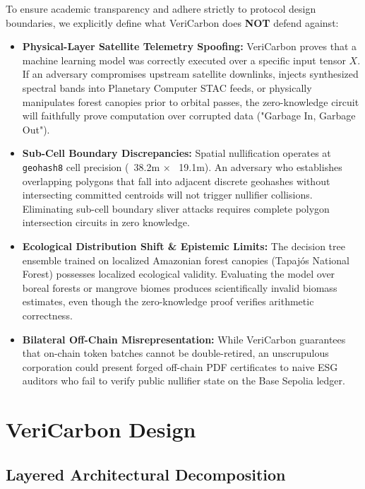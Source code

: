 \documentclass[preprint,12pt]{elsarticle}
\begin{document}
To ensure academic transparency and adhere strictly to protocol design boundaries, we explicitly define what VeriCarbon does \textbf{NOT} defend against:
\begin{itemize}
\item \textbf{Physical-Layer Satellite Telemetry Spoofing:} VeriCarbon proves that a machine learning model was correctly executed over a specific input tensor $X$. If an adversary compromises upstream satellite downlinks, injects synthesized spectral bands into Planetary Computer STAC feeds, or physically manipulates forest canopies prior to orbital passes, the zero-knowledge circuit will faithfully prove computation over corrupted data ("Garbage In, Garbage Out").
\item \textbf{Sub-Cell Boundary Discrepancies:} Spatial nullification operates at \texttt{geohash8} cell precision (~38.2m × ~19.1m). An adversary who establishes overlapping polygons that fall into adjacent discrete geohashes without intersecting committed centroids will not trigger nullifier collisions. Eliminating sub-cell boundary sliver attacks requires complete polygon intersection circuits in zero knowledge.
\item \textbf{Ecological Distribution Shift \& Epistemic Limits:} The decision tree ensemble trained on localized Amazonian forest canopies (Tapajós National Forest) possesses localized ecological validity. Evaluating the model over boreal forests or mangrove biomes produces scientifically invalid biomass estimates, even though the zero-knowledge proof verifies arithmetic correctness.
\item \textbf{Bilateral Off-Chain Misrepresentation:} While VeriCarbon guarantees that on-chain token batches cannot be double-retired, an unscrupulous corporation could present forged off-chain PDF certificates to naive ESG auditors who fail to verify public nullifier state on the Base Sepolia ledger.
\end{itemize}


\section{VeriCarbon Design}

\subsection{Layered Architectural Decomposition}
\end{document}

